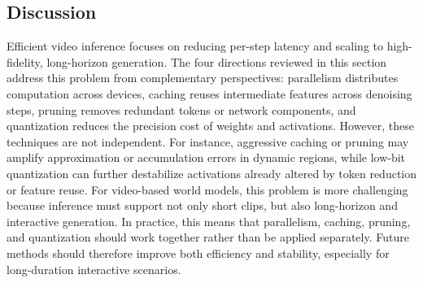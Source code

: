 \documentclass[lettersize,journal]{IEEEtran}
\begin{document}

\subsection{Discussion}
Efficient video inference focuses on reducing per-step latency and scaling to high-fidelity, long-horizon generation. 
The four directions reviewed in this section address this problem from complementary perspectives: parallelism distributes computation across devices, caching reuses intermediate features across denoising steps, pruning removes redundant tokens or network components, and quantization reduces the precision cost of weights and activations. 
However, these techniques are not independent. For instance, aggressive caching or pruning may amplify approximation or accumulation errors in dynamic regions, while low-bit quantization can further destabilize activations already altered by token reduction or feature reuse. 
For video-based world models, this problem is more challenging because inference must support not only short clips, but also long-horizon and interactive generation. In practice, this means that parallelism, caching, pruning, and quantization should work together rather than be applied separately. Future methods should therefore improve both efficiency and stability, especially for long-duration interactive scenarios.
\end{document}
